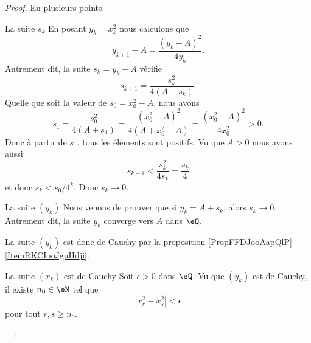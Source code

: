 \begin{proof}
    En plusieurs points.
    \begin{subproof}
        \item[La suite \( s_k\)]
            En posant \( y_k=x_k^2\) nous calculons que
            \begin{equation}
                y_{k+1}-A=\frac{ (y_k-A)^2 }{ 4y_k }.
            \end{equation}
            Autrement dit, la suite \( s_k=y_k-A\) vérifie
            \begin{equation}
                s_{k+1}=\frac{ s_k^2 }{ 4(A+s_k) }.
            \end{equation}
            Quelle que soit la valeur de \( s_0=x_0^2-A\), nous avons
            \begin{equation}
                s_1=\frac{ s_0^2 }{ 4(A+s_1) }=\frac{ (x_0^2-A)^2 }{ 4(A+x_0^2-A) }=\frac{ (x_0^2-A)^2 }{ 4x_0^2 }>0.
            \end{equation}
            Donc à partir de \( s_1\), tous les éléments sont positifs. Vu que \( A>0\) nous avons aussi
            \begin{equation}
                s_{k+1}<\frac{ s_k^2 }{ 4s_k }=\frac{ s_k }{ 4 }
            \end{equation}
            et donc \( s_k<s_0/4^k\). Donc \( s_k\to 0\).
        \item[La suite \( (y_k)\)]
            Nous venons de prouver que si \( y_k=A+s_k\), alors \( s_k\to 0\). Autrement dit, la suite \( y_k\) converge vers \( A\) dans \( \eQ\). 

            La suite \( (y_k)\) est donc de Cauchy par la proposition \ref{PropFFDJooAapQlP}\ref{ItemRKCIooJguHdji}.
        \item[La suite \( (x_k)\) est de Cauchy]
            Soit \( \epsilon>0\) dans \( \eQ\). Vu que \( (y_k)\) est de Cauchy, il existe \( n_0\in \eN\) tel que 
            \begin{equation}
                | x^2_r-x_s^2 |<\epsilon
            \end{equation}
            pour tout \( r,s\geq n_0\).


\end{subproof}
\end{proof}
